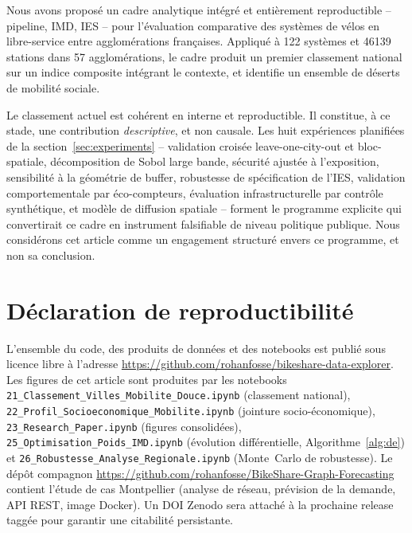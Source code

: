 \documentclass[11pt,a4paper]{article}
\begin{document}
Nous avons proposé un cadre analytique intégré et entièrement
reproductible -- pipeline, IMD, IES -- pour l'évaluation
comparative des systèmes de vélos en libre-service entre
agglomérations françaises. Appliqué à \num{122} systèmes et
\num{46139} stations dans \num{57} agglomérations, le cadre
produit un premier classement national sur un indice composite
intégrant le contexte, et identifie un ensemble de déserts de
mobilité sociale.

Le classement actuel est cohérent en interne et reproductible.
Il constitue, à ce stade, une contribution \emph{descriptive}, et
non causale. Les huit expériences planifiées de la
section~\ref{sec:experiments} -- validation croisée
leave-one-city-out et bloc-spatiale, décomposition de Sobol large
bande, sécurité ajustée à l'exposition, sensibilité à la
géométrie de buffer, robustesse de spécification de l'IES,
validation comportementale par éco-compteurs, évaluation
infrastructurelle par contrôle synthétique, et modèle de
diffusion spatiale -- forment le programme explicite qui
convertirait ce cadre en instrument falsifiable de niveau
politique publique. Nous considérons cet article comme un
engagement structuré envers ce programme, et non sa conclusion.

\section*{Déclaration de reproductibilité}

L'ensemble du code, des produits de données et des notebooks est
publié sous licence libre à l'adresse
\url{https://github.com/rohanfosse/bikeshare-data-explorer}. Les
figures de cet article sont produites par les notebooks
\texttt{21\_Classement\_Villes\_Mobilite\_Douce.ipynb} (classement
national),
\texttt{22\_Profil\_Socioeconomique\_Mobilite.ipynb} (jointure
socio-économique),
\texttt{23\_Research\_Paper.ipynb} (figures consolidées),
\texttt{25\_Optimisation\_Poids\_IMD.ipynb} (évolution
différentielle, Algorithme~\ref{alg:de}) et
\texttt{26\_Robustesse\_Analyse\_Regionale.ipynb} (Monte~Carlo de
robustesse). Le dépôt compagnon
\url{https://github.com/rohanfosse/BikeShare-Graph-Forecasting}
contient l'étude de cas Montpellier (analyse de réseau, prévision
de la demande, API REST, image Docker). Un DOI Zenodo sera
attaché à la prochaine release taggée pour garantir une
citabilité persistante.
\end{document}
